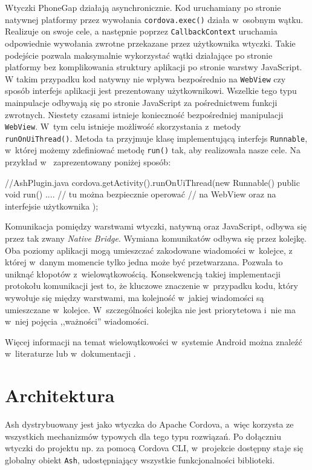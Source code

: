\documentclass[brudnopis]{xmgr}
\begin{document}
Wtyczki PhoneGap działają asynchronicznie. Kod uruchamiany po stronie natywnej platformy przez wywołania \texttt{cordova.exec()} działa w~osobnym wątku. Realizuje on swoje cele, a następnie poprzez \texttt{CallbackContext} uruchamia odpowiednie wywołania zwrotne przekazane przez użytkownika wtyczki. Takie podejście pozwala maksymalnie wykorzystać wątki działające po stronie platformy bez komplikowania struktury aplikacji po stronie warstwy JavaScript. W takim przypadku kod natywny nie wpływa bezpośrednio na \texttt{WebView} czy sposób interfejs aplikacji jest prezentowany użytkownikowi. Wszelkie tego typu mainpulacje odbywają się po stronie JavaScript za pośrednictwem funkcji zwrotnych. Niestety czasami istnieje konieczność bezpośredniej manipulacji \texttt{WebView}. W~tym celu istnieje możliwość skorzystania z~metody \texttt{runOnUiThread()}. Metoda ta przyjmuje klasę implementującą interfejs \texttt{Runnable}, w~której możemy zdefiniować metodę \texttt{run()} tak, aby realizowała nasze cele. Na przykład w~ zaprezentowany poniżej sposób:

\begin{javascriptcode}
//AshPlugin.java
cordova.getActivity().runOnUiThread(new Runnable() {
      public void run() {
   	....        
         // tu można bezpiecznie operować 
         //    na WebView oraz na interfejsie użytkownika
      }
});
\end{javascriptcode}

Komunikacja pomiędzy warstwami wtyczki, natywną oraz JavaScript, odbywa się przez tak zwany \textit{Native Bridge}. Wymiana komunikatów odbywa się przez kolejkę. Oba poziomy aplikacji mogą umieszczać zakodowane wiadomości w~kolejce, z której w~danym momencie tylko jedna może być przetwarzana. Pozwala to uniknąć kłopotów z~wielowątkowością. Konsekwencją takiej implementacji protokołu komunikacji jest to, że kluczowe znaczenie w~przypadku kodu, który wywołuje się między warstwami,  ma kolejność w~jakiej wiadomości są umieszczane w~kolejce. W~szczególności kolejka nie jest priorytetowa i~nie ma w~niej pojęcia ,,ważności'' wiadomości.

Więcej informacji na temat wielowątkowości w~systemie Android można znaleźć w~literaturze \cite{AndroidInPractice} lub w~dokumentacji \cite{AndroidDoc}. 

\chapter{Architektura}

Ash dystrybuowany jest jako wtyczka do Apache Cordova, a~więc korzysta ze wszystkich mechanizmów typowych dla tego typu rozwiązań. Po dołączniu wtyczki do projektu np. za pomocą Cordova CLI, w~projekcie dostępny staje się globalny obiekt \texttt{Ash}, udostępniający wszystkie funkcjonalności biblioteki. 
\end{document}
